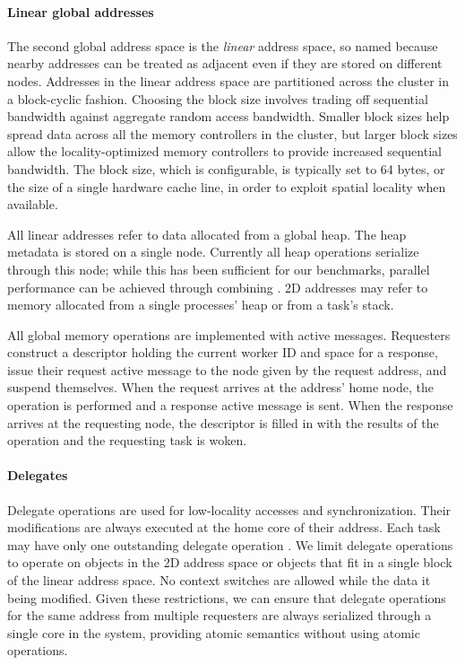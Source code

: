 \paragraph{Linear global addresses} The second global address space is the {\em linear} address space, so
named because nearby addresses can be treated as adjacent even if they
are stored on different nodes. Addresses in the linear address space
are partitioned across the cluster in a block-cyclic fashion. Choosing
the block size involves trading off sequential bandwidth against
aggregate random access bandwidth. Smaller block sizes help spread
data across all the memory controllers in the cluster, but larger
block sizes allow the locality-optimized memory controllers to provide
increased sequential bandwidth. The block size, which is configurable, is typically set to 64
bytes, or the size of a single hardware cache line, in order to
exploit spatial locality when available.

All linear addresses refer to data allocated from a global heap. The
heap metadata is stored on a single node. Currently all heap
operations serialize through this node; while this has been sufficient
for our benchmarks, parallel performance can be achieved through
combining . 2D addresses may
refer to memory allocated from a single processes' heap or from a
task's stack.


All global memory operations are implemented with active
messages. Requesters construct a descriptor holding the current
worker  ID and space for a response, issue their request active
message to the node given by the request address, and suspend
themselves. When the request arrives at the address' home node, the
operation is performed and a response active message is sent. When the
response arrives at the requesting node, the descriptor is filled in
with the results of the operation and the requesting task is woken.

\paragraph{Delegates} Delegate operations are used for low-locality accesses and synchronization. Their modifications
are always executed at the home core of their address. Each task may
have only one outstanding delegate operation . We limit delegate
operations to operate on objects in the 2D address space or objects that
fit in a single block of the linear address space. No context switches
are allowed while the data it being modified. Given these
restrictions, we can ensure that delegate operations for the same address from multiple
requesters are always serialized through a single core in the system,
providing atomic semantics without using atomic operations.

